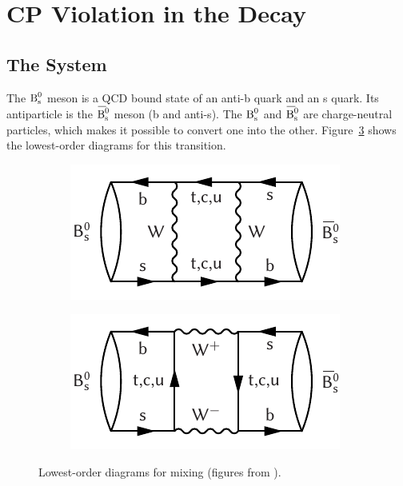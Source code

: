 \section{CP Violation in the \texorpdfstring{\BstoJpsiphi{}}{Bs0->Jpsiphi} Decay}
\label{sec:intro_Jpsiphi}

\subsection{The \texorpdfstring{\BsBsbar{}}{Bs0-Bs0bar} System}
\label{subsec:intro_Jpsiphi_Bs}

The $\text{B}_\text{s}^\text{0}$ meson is a QCD bound state of an anti-b quark and an s quark. Its antiparticle is the $\Bsbar$ meson (b and anti-s). The $\text{B}_\text{s}^\text{0}$
and $\Bsbar$ are charge-neutral particles, which makes it possible to convert one into the other. Figure~\ref{fig:mixing} shows the
lowest-order diagrams for this transition.
\begin{figure}[hbt]
  \centering
  \begin{subfigure}{0.5\textwidth}
    \centering
    \includegraphics{graphics/intro/box1/box1}
    \caption{}
    \label{fig:mixing_1}
  \end{subfigure}%
  \begin{subfigure}{0.5\textwidth}
    \centering
    \includegraphics{graphics/intro/box2/box2}
    \caption{}
    \label{fig:mixing_2}
  \end{subfigure}
  \caption{Lowest-order diagrams for \BsBsbar{} mixing (figures from \cite{LHCb-PAPER-2013-002}).}
  \label{fig:mixing}
\end{figure}

